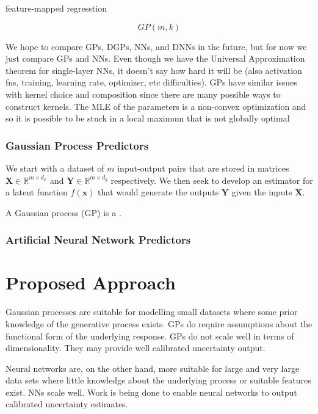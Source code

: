 \documentclass[conference]{IEEEtran}
\begin{document}
	feature-mapped regresstion
	
	\begin{equation*}
	GP(m, k)
	\end{equation*}
	
	We hope to compare GPs, DGPs, NNs, and DNNs in the future, but for now we just compare GPs and NNs. Even though we have the Universal Approximation theorem for single-layer NNs, it doesn't say how hard it will be (also activation fns, training, learning rate, optimizer, etc difficulties). GPs have similar issues with kernel choice and composition since there are many possible ways to construct kernels. The MLE of the parameters is a non-convex optimization and so it is possible to be stuck in a local maximum that is not globally optimal
	
	\subsubsection{Gaussian Process Predictors}
	
	We start with a dataset of $m$ input-output pairs that are stored in matrices $\mathbf{X} \in \mathbb{R}^{m \times d_x}$ and $\mathbf{Y} \in \mathbb{R}^{m \times d_y}$ respectively. We then seek to develop an estimator for a latent function $f(\mathbf{x})$ that would generate the outputs $\mathbf{Y}$ given the inputs $\mathbf{X}$.
	
	A Gaussian process (GP) is a \cite{williams2006gaussian}.
	
	\subsubsection{Artificial Neural Network Predictors}
	
	\section{Proposed Approach}
	\label{sec:proposed-approach}
	
	Gaussian processes are suitable for modelling small datasets where some prior knowledge of the generative process exists. GPs do require assumptions about the functional form of the underlying response. GPs do not scale well in terms of dimensionality. They may provide well calibrated uncertainty output.

    Neural networks are, on the other hand, more suitable for large and very large data sets where little knowledge about the underlying process or suitable features exist. NNs scale well. Work is being done to enable neural networks to output calibrated uncertainty estimates.
	
\end{document}
